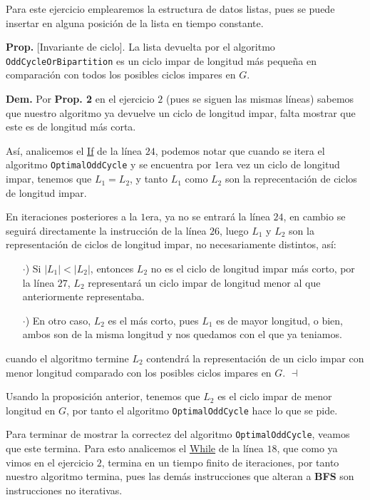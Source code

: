 \documentclass{article}
\newcommand{\code}[1]{\textcolor{white!25!black}{\texttt{#1}}}
\begin{document}
  Para este ejercicio emplearemos la estructura de datos listas, pues se puede insertar
  en alguna posici\'on de la lista en tiempo constante.

  \textbf{Prop.} [Invariante de ciclo]. La lista devuelta por el algoritmo
  \code{OddCycleOrBipartition} es un ciclo impar de longitud m\'as pequeña
  en comparaci\'on con todos los posibles ciclos impares en $G$.

  \textbf{Dem.} Por \textbf{Prop. 2} en el ejercicio $2$ (pues se siguen las
  mismas l\'ineas) sabemos que nuestro algoritmo ya devuelve un ciclo de
  longitud impar, falta mostrar que este es de longitud m\'as corta.

  As\'i, analicemos el \underline{If} de la l\'inea $24$, podemos notar que
  cuando se itera el algoritmo \code{OptimalOddCycle} y se encuentra por $1$era
  vez un ciclo de longitud impar, tenemos que $L_1 = L_2$, y tanto $L_1$ como
  $L_2$ son la reprecentaci\'on de ciclos de longitud impar.

  En iteraciones posteriores a la $1$era, ya no se entrar\'a  la l\'inea $24$,
  en cambio se seguir\'a directamente la instrucci\'on de la l\'inea $26$, luego
  $L_1$ y $L_2$ son la representaci\'on de ciclos de longitud impar, no necesariamente
  distintos, as\'i:
  \begin{itemize}
  \item[$\cdot$)] Si $|L_1|<|L_2|$, entonces $L_2$ no es el ciclo de longitud impar
    m\'as corto, por la l\'inea $27$, $L_2$ representar\'a un ciclo impar de longitud
    menor al que anteriormente representaba.
  \item[$\cdot$)] En otro caso, $L_2$ es el m\'as corto, pues $L_1$ es de mayor
    longitud, o bien, ambos son de la misma longitud y nos quedamos con el que
    ya teniamos.
  \end{itemize}
  cuando el algoritmo termine $L_2$ contendr\'a la representaci\'on de un ciclo impar
  con menor longitud comparado con los posibles ciclos impares en $G$.
  \hfill $\dashv$

  Usando la proposici\'on anterior, tenemos que $L_2$ es el ciclo impar de menor longitud en
  $G$, por tanto el algoritmo \code{OptimalOddCycle} hace lo que se pide.

  Para terminar de mostrar la correctez del algoritmo \code{OptimalOddCycle}, veamos que
  este termina. Para esto analicemos el \underline{While} de la l\'inea $18$, que como ya
  vimos en el ejercicio $2$, termina en un tiempo finito de iteraciones, por tanto
  nuestro algoritmo termina, pues las dem\'as instrucciones que alteran a \textbf{BFS}
  son instrucciones no iterativas.
\end{document}
